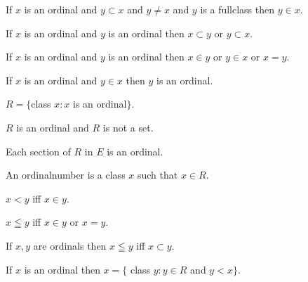\documentclass[a4paper,draft]{amsproc}
\begin{document}
\begin{forthel}
\begin{theorem}[108]
If $x$ is an ordinal and $y \subset x$ and $y \neq x$ and $y$ is a fullclass then $y \in x$.
\end{theorem}

\begin{theorem}[109]
If $x$ is an ordinal and $y$ is an ordinal then $x \subset y$ or $y \subset x$.
\end{theorem}

\begin{theorem}[110]
If $x$ is an ordinal and $y$ is an ordinal then $x \in y$ or $y \in x$ or $x = y$.
\end{theorem}

\begin{theorem}[111]
If $x$ is an ordinal and $y \in x$ then $y$ is an ordinal.
\end{theorem}

\begin{definition}
$R = \{$class $x : x$ is an ordinal$\}$.
\end{definition}

\begin{theorem}[113]
$R$ is an ordinal and $R$ is not a set.
\end{theorem}

\begin{theorem}[114]
Each section of $R$ in $E$ is an ordinal.
\end{theorem}

\begin{definition}[115]
An ordinalnumber is a class $x$ such that $x \in R$.
\end{definition}

\begin{definition}[116]
$x < y$ iff $x \in y$.
\end{definition}

\begin{definition}[117]
$x \leqq y$ iff $x \in y$ or $x = y$.
\end{definition}

\begin{theorem}[118]
If $x, y$ are ordinals then $x \leqq y$ iff $x \subset y$.
\end{theorem}

\begin{theorem}[119]
If $x$ is an ordinal then $x = \{$ class $y : y \in R$ and $y < x\}$.
\end{theorem}


\end{forthel}
\end{document}
